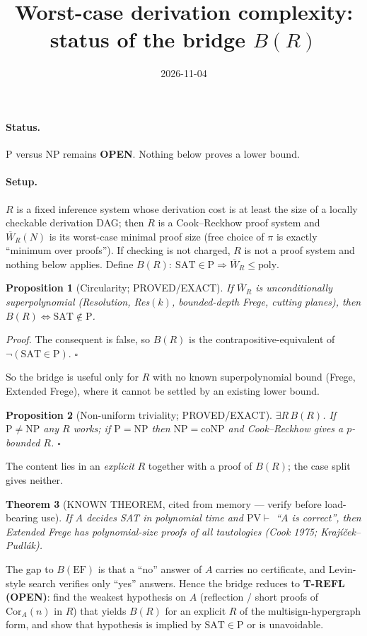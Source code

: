 \documentclass{article}
\title{Worst-case derivation complexity: status of the bridge $B(R)$}
\date{2026-11-04}
\newtheorem{thm}{Theorem}\newtheorem{prop}[thm]{Proposition}
\begin{document}
\maketitle
\paragraph{Status.} P versus NP remains \textbf{OPEN}. Nothing below proves a lower bound.

\paragraph{Setup.} $R$ is a fixed inference system whose derivation cost is at least the size of a locally checkable derivation DAG; then $R$ is a Cook--Reckhow proof system and $\overline W_R(N)$ is its worst-case minimal proof size (free choice of $\pi$ is exactly ``minimum over proofs''). If checking is not charged, $R$ is not a proof system and nothing below applies. Define $B(R):\ \mathrm{SAT}\in\mathrm P\Rightarrow \overline W_R\le\mathrm{poly}$.

\begin{prop}[Circularity; PROVED/EXACT]
If $\overline W_R$ is unconditionally superpolynomial (Resolution, Res$(k)$, bounded-depth Frege, cutting planes), then $B(R)\iff \mathrm{SAT}\notin\mathrm P$.
\end{prop}
\emph{Proof.} The consequent is false, so $B(R)$ is the contrapositive-equivalent of $\neg(\mathrm{SAT}\in\mathrm P)$. $\square$

So the bridge is useful only for $R$ with no known superpolynomial bound (Frege, Extended Frege), where it cannot be settled by an existing lower bound.

\begin{prop}[Non-uniform triviality; PROVED/EXACT]
$\exists R\,B(R)$. If $\mathrm P\ne\mathrm{NP}$ any $R$ works; if $\mathrm P=\mathrm{NP}$ then $\mathrm{NP}=\mathrm{coNP}$ and Cook--Reckhow gives a $p$-bounded $R$. $\square$
\end{prop}
The content lies in an \emph{explicit} $R$ together with a proof of $B(R)$; the case split gives neither.

\begin{thm}[KNOWN THEOREM, cited from memory --- verify before load-bearing use]
If $A$ decides SAT in polynomial time and $\mathrm{PV}\vdash$ ``$A$ is correct'', then Extended Frege has polynomial-size proofs of all tautologies (Cook 1975; Krajíček--Pudlák).
\end{thm}
The gap to $B(\mathrm{EF})$ is that a ``no'' answer of $A$ carries no certificate, and Levin-style search verifies only ``yes'' answers. Hence the bridge reduces to \textbf{T-REFL (OPEN)}: find the weakest hypothesis on $A$ (reflection / short proofs of $\mathrm{Cor}_A(n)$ in $R$) that yields $B(R)$ for an explicit $R$ of the multisign-hypergraph form, and show that hypothesis is implied by $\mathrm{SAT}\in\mathrm P$ or is unavoidable.
\end{document}
